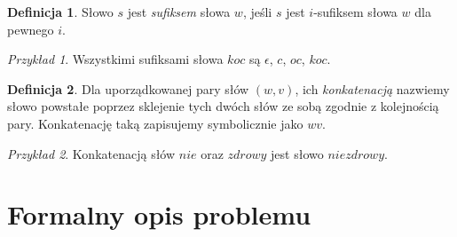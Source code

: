\documentclass[declaration,shortabstract]{iithesis}
\theoremstyle{definition} \newtheorem{definition}{Definicja}[chapter]
\theoremstyle{remark} \newtheorem{remark}[definition]{Obserwacja}
\theoremstyle{plain} \newtheorem{theorem}[definition]{Twierdzenie}
\theoremstyle{remark} \newtheorem{example}{Przykład}[definition]
\theoremstyle{plain} \newtheorem{lemma}[definition]{Lemat}
\begin{document}
\begin{definition}
    Słowo $s$ jest \textit{sufiksem} słowa $w$, jeśli $s$ jest $i$-sufiksem słowa $w$ dla pewnego $i$.
\end{definition}

\begin{example}
    Wszystkimi sufiksami słowa $koc$ są $\epsilon$, $c$, $oc$, $koc$.
\end{example}

\begin{definition}
    Dla uporządkowanej pary słów $(w, v)$, ich \textit{konkatenacją} nazwiemy słowo powstałe poprzez sklejenie tych dwóch słów ze sobą zgodnie z kolejnością pary. Konkatenację taką zapisujemy symbolicznie jako $wv$.
\end{definition}

\begin{example}
    Konkatenacją słów $nie$ oraz $zdrowy$ jest słowo $niezdrowy$.
\end{example}

\section{Formalny opis problemu}
\end{document}
